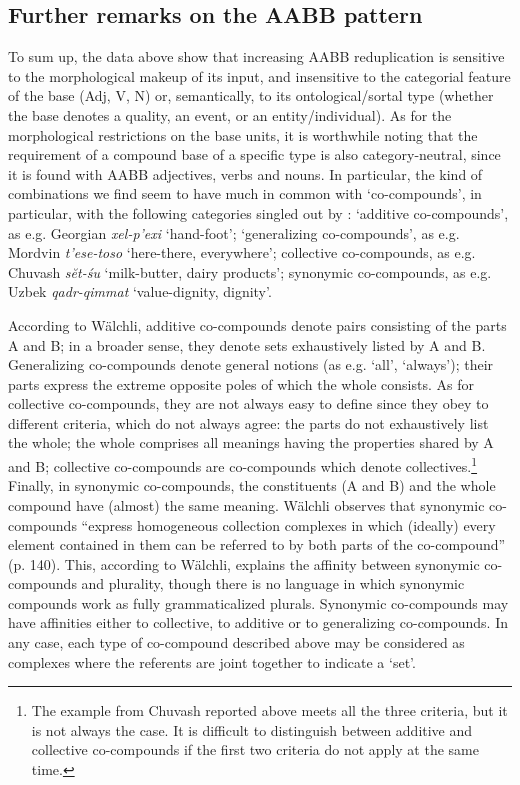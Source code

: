 \documentclass[output=paper]{langsci/langscibook}
\begin{document}
\subsection{Further remarks on the AABB pattern}
To sum up, the data above show that increasing AABB reduplication is
sensitive to the morphological makeup of its input, and insensitive to
the categorial feature of the base (Adj, V, N) or, semantically, to its
ontological/sortal type (whether the base denotes a quality, an event,
or an entity/individual). As for the morphological restrictions on the
base units, it is worthwhile noting that the requirement of a compound
base of a specific type is also category-neutral, since it is found with
AABB adjectives, verbs and nouns. In particular, the kind of 
combinations we find seem to have much in common with `co-compounds', in
particular, with the following categories singled out by %
\citet[138]{Waelchli2005}%
%
: `additive co-compounds', as e.g. Georgian \emph{xel-p'exi}
`hand-foot'; `generalizing co-compounds', as e.g. Mordvin
\emph{t'ese-toso} `here-there, everywhere'; collective co-compounds, as
e.g. Chuvash \emph{sĕt-śu} `milk-butter, dairy products'; synonymic
co-compounds, as e.g. Uzbek \emph{qadr-qimmat} `value-dignity, dignity'.

According to Wälchli, additive co-compounds denote pairs consisting of
the parts A and B; in a broader sense, they denote sets exhaustively
listed by A and B. Generalizing co-compounds denote general notions (as
e.g. `all', `always'); their parts express the extreme opposite poles of
which the whole consists. As for collective co-compounds, they are not
always easy to define since they obey to different criteria, which do
not always agree: the parts do not exhaustively list the whole; the
whole comprises all meanings having the properties shared by A and B;
collective co-compounds are co-compounds which denote
collectives.\footnote{The example from Chuvash reported above meets all
  the three criteria, but it is not always the case. It is difficult to
  distinguish between additive and collective co-compounds if the first
  two criteria do not apply at the same time.} Finally, in synonymic
co-compounds, the constituents (A and B) and the whole compound have
(almost) the same meaning. Wälchli observes that synonymic co-compounds
``express homogeneous collection complexes in which (ideally) every
element contained in them can be referred to by both parts of the
co-compound'' (p. 140). This, according to Wälchli, explains the
affinity between synonymic co-compounds and plurality, though there is
no language in which synonymic compounds work as fully grammaticalized
plurals. Synonymic co-compounds may have affinities either to
collective, to additive or to generalizing co-compounds. In any case,
each type of co-compound described above may be considered as complexes
where the referents are joint together to indicate a `set'.
\end{document}
